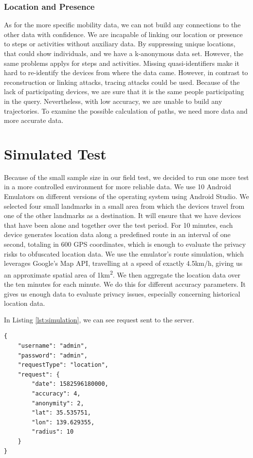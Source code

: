 \subsubsection{Location and Presence}
As for the more specific mobility data, we can not build any connections to the other data with confidence. We are incapable of linking our location or presence to steps or activities without auxiliary data. By suppressing unique locations, that could show individuals, and we have a k-anonymous data set. However, the same problems applys for steps and activities. Missing quasi-identifiers make it hard to re-identify the devices from where the data came. 
However, in contrast to reconstruction or linking attacks, tracing attacks could be used. Because of the lack of participating devices, we are sure that it is the same people participating in the query. Nevertheless, with low accuracy, we are unable to build any trajectories. To examine the possible calculation of paths, we need more data and more accurate data.

\section{Simulated Test}
Because of the small sample size in our field test, we decided to run one more test in a more controlled environment for more reliable data. We use 10 Android Emulators on different versions of the operating system using Android Studio. We selected four small landmarks in a small area from which the devices travel from one of the other landmarks as a destination. It will ensure that we have devices that have been alone and together over the test period. For 10 minutes, each device generates location data along a predefined route in an interval of one second, totaling in 600 GPS coordinates, which is enough to evaluate the privacy risks to obfuscated location data. We use the emulator's route simulation, which leverages Google's Map API,  travelling at a speed of exactly 4.5km/h, giving us an approximate spatial area of 1km\textsuperscript{2}. We then aggregate the location data over the ten minutes for each minute. We do this for different accuracy parameters. It gives us enough data to evaluate privacy issues, especially concerning historical location data.

In Listing \ref{lst:simulation}, we can see request sent to the server.  

\begin{lstlisting}[caption=Body of an HTTP request starting a new aggregation with the devices., label={lst:simulation}]
{
    "username": "admin",
    "password": "admin",
    "requestType": "location",
    "request": {
        "date": 1582596180000,
        "accuracy": 4,
        "anonymity": 2,
        "lat": 35.535751,
        "lon": 139.629355,
        "radius": 10
    }
}
\end{lstlisting}

